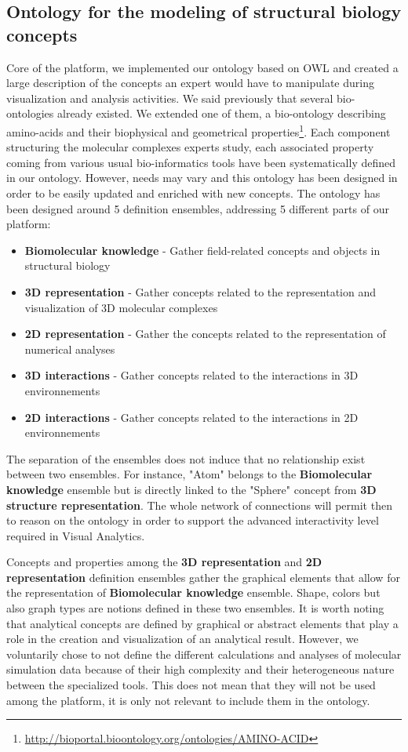 \documentclass{vgtc}                          %
\begin{document}
\subsection{Ontology for the modeling of structural biology concepts}

Core of the platform, we implemented our ontology based on OWL and created a large description of the concepts an expert would have to manipulate during visualization and analysis activities. We said previously that several bio-ontologies already existed. We extended one of them, a bio-ontology describing amino-acids and their biophysical and geometrical properties\footnote{\url{http://bioportal.bioontology.org/ontologies/AMINO-ACID}}.
Each component structuring the molecular complexes experts study, each associated property coming from various usual bio-informatics tools have been systematically defined in our ontology. However, needs may vary and this ontology has been designed in order to be easily updated and enriched with new concepts.
The ontology has been designed around 5 definition ensembles, addressing 5 different parts of our platform:

\begin{itemize}
  \item \textbf{Biomolecular knowledge} - Gather field-related concepts and objects in structural biology 
  \item \textbf{3D representation} - Gather concepts related to the representation and visualization of 3D molecular complexes
  \item \textbf{2D representation} - Gather the concepts related to the representation of numerical analyses 
  \item \textbf{3D interactions} - Gather concepts related to the interactions in 3D environnements
  \item \textbf{2D interactions} - Gather concepts related to the interactions in 2D environnements
\end{itemize}

The separation of the ensembles does not induce that no relationship exist between two ensembles. For instance, "Atom" belongs to the \textbf{Biomolecular knowledge} ensemble but is directly linked to the "Sphere" concept from \textbf{3D structure representation}. The whole network of connections will permit then to reason on the ontology in order to support the advanced interactivity level required in Visual Analytics.

Concepts and properties among the \textbf{3D representation} and \textbf{2D representation} definition ensembles gather the graphical elements that allow for the representation of \textbf{Biomolecular knowledge} ensemble. Shape, colors but also graph types are notions defined in these two ensembles. It is worth noting that analytical concepts are defined by graphical or abstract elements that play a role in the creation and visualization of an analytical result. However, we voluntarily chose to not define the different calculations and analyses of molecular simulation data because of their high complexity and their heterogeneous nature between the specialized tools. This does not mean that they will not be used among the platform, it is only not relevant to include them in the ontology.
\end{document}
